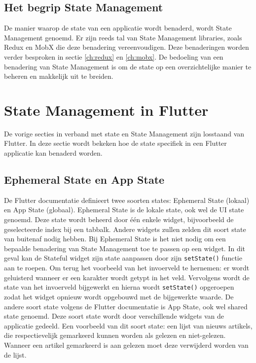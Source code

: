\subsection{Het begrip State Management}
De manier waarop de state van een applicatie wordt benaderd, wordt State Management genoemd. Er zijn reeds tal van State Management libraries, zoals Redux en MobX die deze benadering vereenvoudigen. Deze benaderingen worden verder besproken in sectie \ref{ch:redux} en \ref{ch:mobx}. De bedoeling van een benadering van State Management is om de state op een overzichtelijke manier te beheren en makkelijk uit te breiden.

\section{State Management in Flutter}
De vorige secties in verband met state en State Management zijn losstaand van Flutter. In deze sectie wordt bekeken hoe de state specifiek in een Flutter applicatie kan benaderd worden.

\subsection{Ephemeral State en App State}
De Flutter documentatie definieert twee soorten states: Ephemeral State (lokaal) en App State (globaal).
Ephemeral State is de lokale state, ook wel de UI state genoemd. Deze state wordt beheerd door één enkele widget, bijvoorbeeld de geselecteerde index bij een tabbalk. Andere widgets zullen zelden dit soort state van buitenaf nodig hebben. Bij Ephemeral State is het niet nodig om een bepaalde benadering van State Management toe te passen op een widget. In dit geval kan de Stateful widget zijn state aanpassen door zijn \verb|setState()| functie aan te roepen.
Om terug het voorbeeld van het invoerveld te hernemen: er wordt geluisterd wanneer er een karakter wordt getypt in het veld. Vervolgens wordt de state van het invoerveld bijgewerkt en hierna wordt \verb|setState()| opgeroepen zodat het widget opnieuw wordt opgebouwd met de bijgewerkte waarde.
\newline
De andere soort state volgens de Flutter documentatie \autocite{Developers2019} is App State, ook wel shared state genoemd. Deze soort state wordt door verschillende widgets van de applicatie gedeeld.
Een voorbeeld van dit soort state: een lijst van nieuws artikels, die respectievelijk gemarkeerd kunnen worden als gelezen en niet-gelezen. Wanneer een artikel gemarkeerd is aan gelezen moet deze verwijderd worden van de lijst. 
\newline

